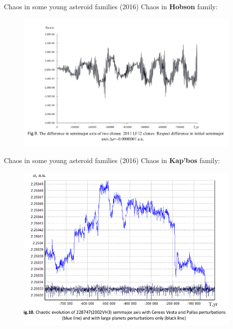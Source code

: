 \documentclass{beamer}
\begin{document}
\begin{frame}{Chaos in some young asteroid families (2016)}
        Chaos in \textbf{Hobson} family:
\begin{figure}[h]
\begin{minipage}[h]{0.9\linewidth}
\includegraphics[width=1\linewidth]{./16_2.png}
\end{minipage}
\end{figure}
\end{frame}

\begin{frame}{Chaos in some young asteroid families (2016)}
        Chaos in \textbf{Kap'bos} family:
\begin{figure}[h]
\begin{minipage}[h]{0.8\linewidth}
\includegraphics[width=1\linewidth]{./16_3.png}
\end{minipage}
\end{figure}
\end{frame}
\end{document}
